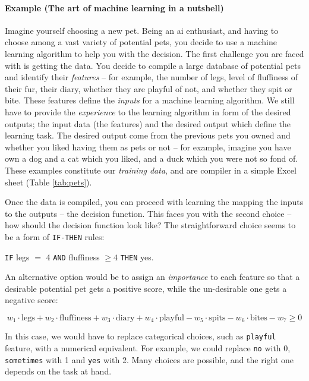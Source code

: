 \paragraph{Example (The art of machine learning in a nutshell)} Imagine yourself choosing a new pet.
Being an \gls{ai} enthusiast, and having to choose among a vast variety of potential pets, you decide to use a machine learning algorithm to help you with the decision.
The first challenge you are faced with  is getting the data.
You decide to compile a large database of potential pets and identify their \textit{features} -- for example, the number of legs, level of fluffiness of their fur, their diary, whether they are playful of not, and whether they spit or bite.
These features define the \textit{inputs} for a machine learning algorithm.
We still have to provide the \textit{experience} to the learning algorithm in form of the desired outputs; the input data (the features) and the desired output which define the learning task.
The desired output come from the previous pets you owned and whether you liked having them as pets or not -- for example, imagine you have own a dog and a cat which you liked, and a duck which you were not so fond of.
These examples constitute our \textit{training data}, and are compiler in a simple Excel sheet (Table \ref{tab:pets}).



Once the data is compiled, you can proceed with learning the  mapping the inputs to the outputs -- the decision function.
This faces you with the second choice -- how should the decision function look like?
The straightforward choice seems to be a form of \texttt{IF-THEN} rules:
\begin{center}
	\texttt{IF} legs $=$ 4 \texttt{AND} fluffiness $\geq 4$ \texttt{THEN} yes.
\end{center}
An alternative option would be to assign an \textit{importance} to each feature so that a desirable potential pet gets a positive score, while the un-desirable one gets a negative score:

$$ w_1 \cdot \text{legs} + w_2 \cdot \text{fluffiness} + w_3 \cdot \text{diary} + w_4 \cdot \text{playful} - w_5 \cdot \text{spits} - w_6 \cdot \text{bites} - w_7 \geq 0$$

In this case, we would have to replace categorical choices, such as \texttt{playful} feature, with a numerical equivalent.
For example, we could replace \texttt{no} with 0, \texttt{sometimes} with 1 and \texttt{yes} with 2.
Many choices are possible, and the right one depends on the task at hand.


